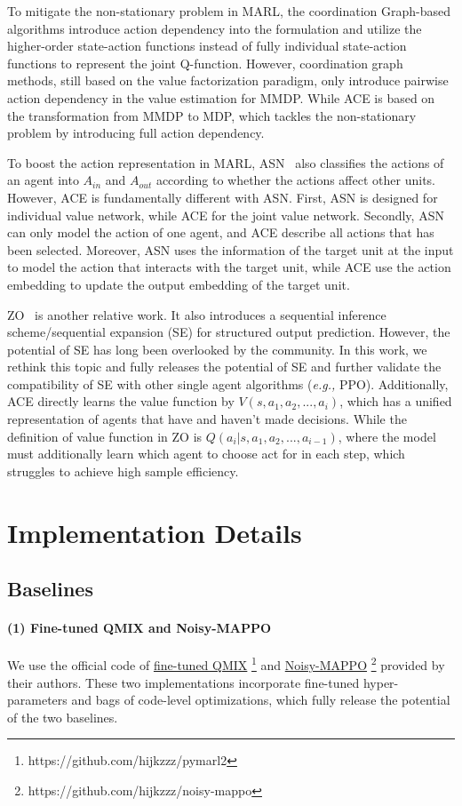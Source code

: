 \documentclass[letterpaper]{article} \usepackage{aaai23}  \usepackage{times}  \usepackage{helvet}  \usepackage{courier}  \usepackage[hyphens]{url}  \usepackage{graphicx} \urlstyle{rm} \def\UrlFont{\rm}  \usepackage{natbib}  \usepackage{caption} \frenchspacing  \setlength{\pdfpagewidth}{8.5in} \setlength{\pdfpageheight}{11in} \usepackage{algorithm}
\begin{document}
To mitigate the non-stationary problem in MARL, the coordination Graph-based algorithms introduce action dependency into the formulation and utilize the higher-order state-action functions instead of fully individual state-action functions to represent the joint Q-function. However, coordination graph methods, still based on the value factorization paradigm, only introduce pairwise action dependency in the value estimation for MMDP. While ACE is based on the transformation from MMDP to MDP, which tackles the non-stationary problem by introducing full action dependency. 

To boost the action representation in MARL, ASN~\citeyear{wang2019action} also classifies the actions of an agent into $A_{in}$ and $A_{out}$ according to whether the actions affect other units. However, ACE is fundamentally different with ASN. First, ASN is designed for individual value network, while ACE for the joint value network. Secondly, ASN can only model the action of one agent, and ACE describe all actions that has been selected. Moreover, ASN uses the information of the target unit at the input to model the action that interacts with the target unit, while ACE use the action embedding to update the output embedding of the target unit.

ZO~\citeyear{usunier2016episodic} is another relative work. It also introduces a sequential inference scheme/sequential expansion (SE) for structured output prediction. However, the potential of SE has long been overlooked by the community. In this work, we rethink this topic and fully releases the potential of SE and further validate the compatibility of SE with other single agent algorithms (\textit{e.g.,} PPO). Additionally, ACE directly learns the value function by $V(s,a_1,a_2,...,a_i)$, which has a unified representation of agents that have and haven't made decisions. While the definition of value function in ZO is $Q(a_i|s,a_1,a_2,...,a_{i-1})$, where the model must additionally learn which agent to choose act for in each step, which struggles to achieve high sample efficiency.



\section{Implementation Details}
\label{sec: details}
\subsection{Baselines}
\paragraph{(1) Fine-tuned QMIX\citeyear{pymarl2} and Noisy-MAPPO\citeyear{noisy_mappo}}
We use the official code of \href{https://github.com/hijkzzz/pymarl2}{fine-tuned QMIX} \footnote{https://github.com/hijkzzz/pymarl2} and \href{https://github.com/hijkzzz/noisy-mappo}{Noisy-MAPPO} \footnote{https://github.com/hijkzzz/noisy-mappo} provided by their authors. These two implementations incorporate fine-tuned hyper-parameters and bags of code-level optimizations, which fully release the potential of the two baselines.
\end{document}
